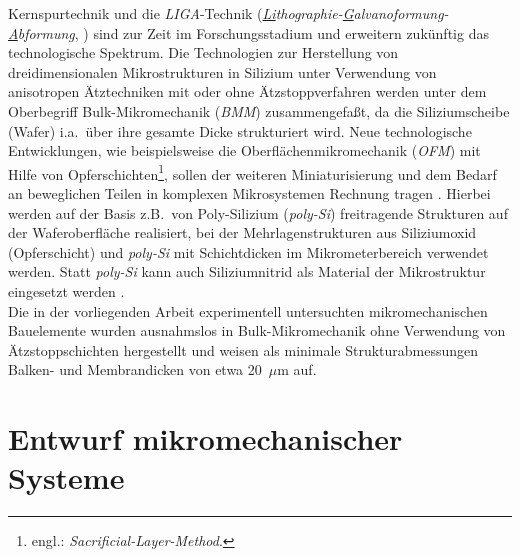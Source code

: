 Kernspurtechnik \cite{Spo90} und die {\em LIGA}-Technik
({\em \underline{Li}thographie-\underline{G}alvanoformung-\underline{A}bformung},
\cite{Bec86}) sind zur Zeit im
Forschungsstadium und erweitern zukünftig das technologische Spektrum.
Die Technologien zur Herstellung von dreidimensionalen Mikrostrukturen in
Silizium unter Verwendung von anisotropen Ätztechniken mit oder ohne
Ätzstoppverfahren
werden unter dem Oberbegriff Bulk-Mikromechanik ({\em BMM}) zusammengefaßt,
da die Siliziumscheibe (Wafer) i.a.\ über ihre gesamte Dicke strukturiert
wird. Neue technologische Entwicklungen, wie beispielsweise die
Oberflächenmikromechanik ({\em OFM}) mit Hilfe von
Opferschichten\footnote{engl.: {\em Sacrificial-Layer-Method}.},
sollen der weiteren Miniaturisierung und
dem Bedarf an beweglichen Teilen in komplexen Mikrosystemen Rechnung
tragen \cite{How87, Fan87}. Hierbei werden auf der Basis z.B.\
von Poly-Silizium ({\em poly-Si})
freitragende Strukturen auf der Waferoberfläche realisiert, bei der
Mehrlagenstrukturen aus Siliziumoxid (Opferschicht) und {\em poly-Si} mit
Schichtdicken im Mikrometerbereich verwendet werden. Statt {\em poly-Si}
kann auch Siliziumnitrid als Material der Mikrostruktur eingesetzt
werden \cite{Smi92a}.\\
%
Die in der vorliegenden Arbeit experimentell untersuchten mikromechanischen
Bauelemente wurden ausnahmslos in Bulk-Mikromechanik ohne
Verwendung von Ätzstoppschichten hergestellt und weisen als minimale
Strukturabmessungen Balken- und Membrandicken von etwa 20~$\mu$m auf.


\section{Entwurf mikromechanischer Systeme}
\label{entwurf}

